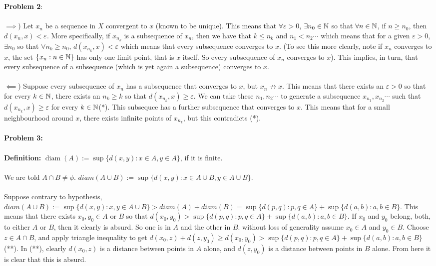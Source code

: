 \documentclass[../Main.tex]{subfiles}
\begin{document}
\textbf{Problem 2}:
\\\\ $\implies$) Let $x_n$ be a sequence in $X$ convergent to $x$ (known to be unique). This means that $\forall \varepsilon>0$, $\exists n_0 \in \mathbb N$ so that $\forall n \in \mathbb N$, if $n \geq n_0$, then $d(x_n,x)<\varepsilon$. More specifically, if $x_{n_k}$ is a subsequence of $x_n$, then we have that $k \leq n_k$ and $n_1<n_2 \cdots$ which means that for a given $\varepsilon>0$, $\exists n_0$ so that $\forall n_k \geq n_0$, $d(x_{n_k},x)<\varepsilon$ which means that every subsequence converges to $x$. (To see this more clearly, note if $x_n$ converges to $x$, the set $\{x_n: n \in \mathbb N\}$ has only one limit point, that is $x$ itself. So every subsequence of $x_n$ converges to $x$). This implies, in turn, that every subsequence of a subsequence (which is yet again a subsequence) converges to $x$.
\\\\ $\impliedby$) Suppose every subsequence of $x_n$ has a subsequence that converges to $x$, but $x_n \not \to x$. This means that there exists an $\varepsilon>0$ so that for every $k \in \mathbb N$, there exists an $n_k \geq k$ so that $d(x_{n_k},x)\geq \varepsilon$. We can take these $n_1,n_2 \cdots $ to generate a subsequence $x_{n_1},x_{n_2} \cdots$ such that $d(x_{n_k},x)\geq \varepsilon$ for every $k \in \mathbb N$(*). This subsequce has a further subsequence that converges to $x$. This means that for a small neighbourhood around $x$, there exists infinite points of $x_{n_k}$, but this contradicts (*).
\\\\ \textbf{Problem 3:}
\\\\ \textbf{Definition:} $\operatorname{diam}(A):=\sup\{d(x,y): x \in A, y \in A\}$, if it is finite. 
\\\\ We are told $A \cap B \neq \phi$. $diam(A \cup B):=\sup\{d(x,y): x \in A\cup B, y \in A \cup B\}$. 
\\\\ Suppose contrary to hypothesis, $diam(A \cup B):=\sup\{d(x,y):x,y \in A \cup B\} > diam(A)+diam(B)=\sup\{d(p,q):p,q \in A\}+\sup\{d(a,b):a,b \in B\}$. This means that there exists $x_0,y_0 \in A$ or $B$ so that $d(x_0,y_0)>\sup\{d(p,q):p,q \in A\}+\sup\{d(a,b):a,b \in B\}$. If $x_0$ and $y_0$ belong, both, to either $A$ or $B$, then it clearly is absurd. So one is in $A$ and the other in $B$. without loss of generality assume $x_0 \in A$ and $y_0 \in B$. Choose $z \in A \cap B$, and apply triangle inequality to get $d(x_0,z)+d(z,y_0)\geq d(x_0,y_0)>\sup\{d(p,q):p,q \in A\}+\sup\{d(a,b):a,b \in B\}$ (**). In (**), clearly $d(x_0,z)$ is a distance between points in $A$ alone, and $d(z,y_0)$ is a distance between points in $B$ alone. From here it is clear that this is absurd.
\end{document}

